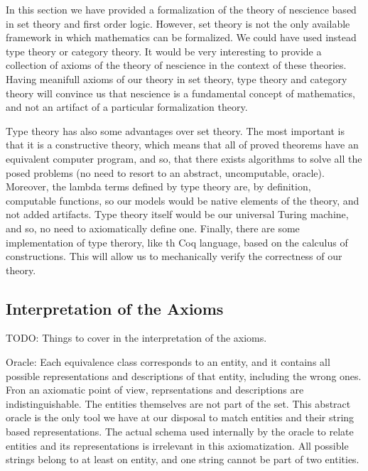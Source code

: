 \begin{remark}
In this section we have provided a formalization of the theory of nescience based in set theory and first order logic. However, set theory is not the only available framework in which mathematics can be formalized. We could have used instead type theory or category theory. It would be very interesting to provide a collection of axioms of the theory of nescience in the context of these theories. Having meanifull axioms of our theory in set theory, type theory and category theory will convince us that nescience is a fundamental concept of mathematics, and not an artifact of a particular formalization theory.

Type theory has also some advantages over set theory. The most important is that it is a constructive theory, which means that all of proved theorems have an equivalent computer program, and so, that there exists algorithms to solve all the posed problems (no need to resort to an abstract, uncomputable, oracle). Moreover, the lambda terms defined by type theory are, by definition, computable functions, so our models would be native elements of the theory, and not added artifacts. Type theory itself would be our universal Turing machine, and so, no need to axiomatically define one. Finally, there are some implementation of type therory, like th Coq language, based on the calculus of constructions. This will allow us to mechanically verify the correctness of our theory.
\end{remark}


%
%

\subsection{Interpretation of the Axioms}

{\color{red} TODO: Things to cover in the interpretation of the axioms.}

Oracle: Each equivalence class corresponds to an entity, and it contains all possible representations
and descriptions of that entity, including the wrong ones. Fron an axiomatic point of view,
reprsentations and descriptions are indistinguishable. The entities themselves are not part of the
set. This abstract oracle is the only tool we have at our disposal to match entities and their
string based representations. The actual schema used internally by the oracle to relate entities and
its representations is irrelevant in this axiomatization. All possible strings belong to at least on
entity, and one string cannot be part of two entities.


